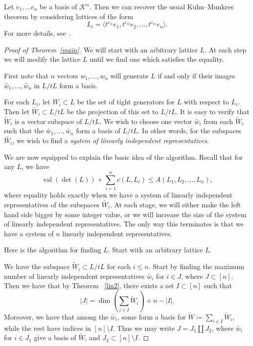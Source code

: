 \documentclass[ALCO,ThmDefs,Unicode,epreuves]{cedram}
\newcommand{\cK}{\mathcal{K}}
\newcommand{\val}{\operatorname{val}}
\begin{document}
\begin{rema} Let $e_1, \dots e_n$ be a basis of $\cK^n$. Then we can recover the usual Kuhn--Munkres theorem by considering lattices of the form
\[
L_i = \langle t^{c_{i1}}e_1, t^{c_{i2}}e_2, \dots, t^{c_{in}}e_n\rangle .
\]
For more details, see~\cite{LO}.
\end{rema}



\begin{proof}[Proof of Theorem~\ref{main}] We will start with an arbitrary lattice $L$. At each step we will modify the lattice $L$ until we find one which satisfies the equality. 

First note that $n$ vectors $w_1, \dots, w_n$ will generate $L$ if and only if their images $\tilde{w_1}, \dots, \tilde{w_n}$ in $L/tL$ form a basis. 

For each $L_i$, let $W_i \subset L$ be the set of tight generators for $L$ with respect to $L_i$. Then let $\tilde{W}_i \subset L/tL$ be the projection of this set to $L/tL$. It is easy to verify that $\tilde{W}_i$ is a vector subspace of $L/tL$. We wish to choose one vector $\tilde{w_i}$ from each $\tilde{W}_i$ such that the $\tilde{w_1}, \dots, \tilde{w_n}$ form a basis of $L/tL$. In other words, for the subspaces $\tilde{W_i}$, we wish to find a \emph{system of linearly independent representatives}.

We are now equipped to explain the basic idea of the algorithm. Recall that for any $L$, we have
\[
\val(\det(L)) + \sum_{i=1}^n c(L,L_i) \leq A(L_1, L_2, \dots, L_n),
\]
where equality holds exactly when we have a system of linearly independent representatives of the subspaces $\tilde{W_i}$. At each stage, we will either make the left hand side bigger by some integer value, or we will increase the size of the system of linearly independent representatives. The only way this terminates is that we have a system of $n$ linearly independent representatives.

Here is the algorithm for finding $L$. Start with an arbitrary lattice $L$.

We have the subspace $\tilde{W}_i \subset L/tL$ for each $i \leq n$. Start by finding the maximum number of linearly independent representatives $\tilde{w_i}$ for $i \in J$, where $J \subset [n]$. Then we have that by Theorem ~\ref{lin2}, there exists a set $I \subset [n]$ such that 
\[
|J| = \dim \left( \sum_{i\in I} \tilde{W}_i \right) + n - |I|.
\]
Moreover, we have that among the $\tilde{w_i}$, some form a basis for $\tilde{W} \coloneqq  \sum_{i \in I} \tilde{W}_i$, while the rest have indices in $[n] \setminus I$. Thus we may write $J = J_1 \coprod J_2$, where $\tilde{w_i}$ for $i \in J_1$ give a basis of $\tilde{W}$, and $J_2 \subset [n] \setminus I.$


\end{proof}
\end{document}
